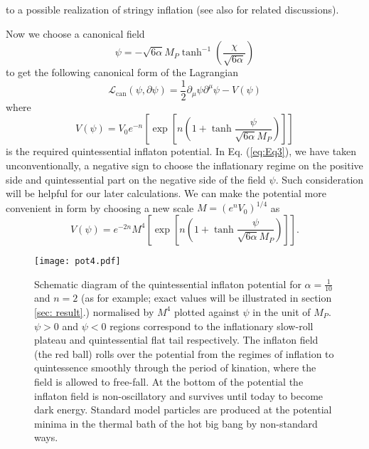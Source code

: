 \documentclass[a4paper,11pt]{article}
\begin{document}
to a possible realization  of stringy  inflation (see also \cite{Dasgupta:2018rtp} for related discussions).\par  
Now we choose a canonical field 
\begin{equation}
    \psi = -\sqrt{6\alpha} M_P \tanh^{-1}{\left(\frac{\chi}{\sqrt{6\alpha}}\right)}
    \label{eq:Eq3}
\end{equation}
to get the following canonical form of the Lagrangian
\begin{equation}
    \mathcal{L}_{\mathrm{can}}(\psi,\partial\psi)=\frac{1}{2}\partial_\mu\psi\partial^\mu\psi - V(\psi)
    \label{eq:Eq4}
\end{equation}
where
\begin{equation}
    V(\psi)= V_0 e^{-n}\left[\exp\left[n\left(1+\tanh{\frac{\psi}{\sqrt{6\alpha}M_P}}\right)\right]\right]
\end{equation} is the required quintessential inflaton potential. In Eq. (\ref{eq:Eq3}), we have taken unconventionally, a negative sign to choose the inflationary regime on the positive side and quintessential part on the negative side of the field $\psi$. Such consideration will be helpful for our later calculations. We can make the potential more convenient in form by choosing a new scale $M=(e^n V_0)^{1/4}$ as
\begin{equation}
    V(\psi)=e^{-2n}M^4\left[\exp\left[n\left(1+\tanh{\frac{\psi}{\sqrt{6\alpha}M_P}}\right)\right]\right].
    \label{eq:Eq6}
\end{equation}
\begin{figure}[H]
	\centering
	\texttt{[image: pot4.pdf]}
	\caption{Schematic diagram of the quintessential inflaton potential for $\alpha=\frac{1}{10}$ and $n=2$ (as for example; exact values will be illustrated in section \ref{sec: result}.) normalised by $M^4$ plotted against $\psi$ in the unit of $M_P$. $\psi>0$ and $\psi<0$ regions correspond to the inflationary slow-roll plateau and quintessential flat tail respectively. The inflaton field (the red ball) rolls over the potential from the regimes of inflation to quintessence smoothly through the period of kination, where the field is allowed to free-fall. At the bottom of the potential the inflaton field is non-oscillatory and survives until today to become dark energy. Standard model particles are produced at the potential minima in the thermal bath of the hot big bang by non-standard ways.}
	\label{fig:Fig1}
\end{figure}
\end{document}
